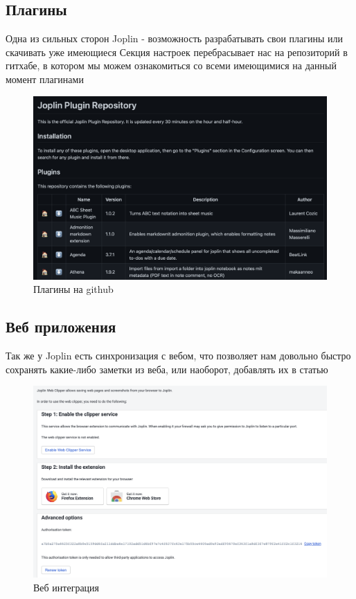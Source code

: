 \documentclass[12pt, a4paper]{article}
\begin{document}
    \subsection{Плагины}
    Одна из сильных сторон Joplin - возможность разрабатывать свои плагины или скачивать уже имеющиеся
    Секция настроек перебрасывает нас на репозиторий в гитхабе, в котором мы можем ознакомиться со всеми имеющимися на данный момент плагинами
    \begin{figure}[H]
        \centering
        \includegraphics[width=0.75\linewidth]{src/16.png}
        \caption{Плагины на github}
    \end{figure}
    
    
    \subsection{Веб приложения}
    Так же у Joplin есть синхронизация с вебом, что позволяет нам довольно быстро сохранять какие-либо заметки из веба, или наоборот, добавлять их в статью
    \begin{figure}[H]
        \centering
        \includegraphics[width=0.75\linewidth]{src/17.png}
        \caption{Веб интеграция}
    \end{figure}
    
    \newpage
\end{document}
